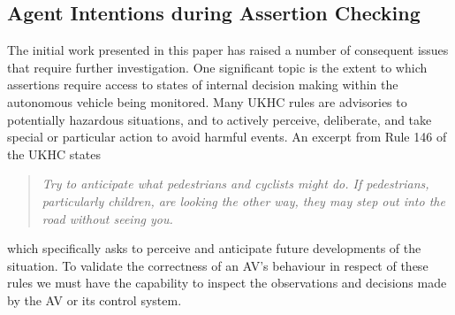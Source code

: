 \subsection{Agent Intentions during Assertion Checking}
The initial work presented in this paper has raised a number of consequent issues that require further investigation. One significant topic is the extent to which assertions require access to states of internal decision making within the autonomous vehicle being monitored. Many UKHC rules are advisories to %
potentially hazardous situations, and to actively perceive, deliberate, and take special or particular action to avoid harmful events. 
% 
An excerpt from Rule 146 of the UKHC states \begin{quote} \textit{Try to anticipate what pedestrians and cyclists might do. If pedestrians, particularly children, are looking the other way, they may step out into the road without seeing you.} \end{quote} which specifically asks to perceive and anticipate future developments of the situation. To validate the correctness of an AV's behaviour in respect of these rules we must have the capability to inspect the observations and decisions made by the AV or its control system.





